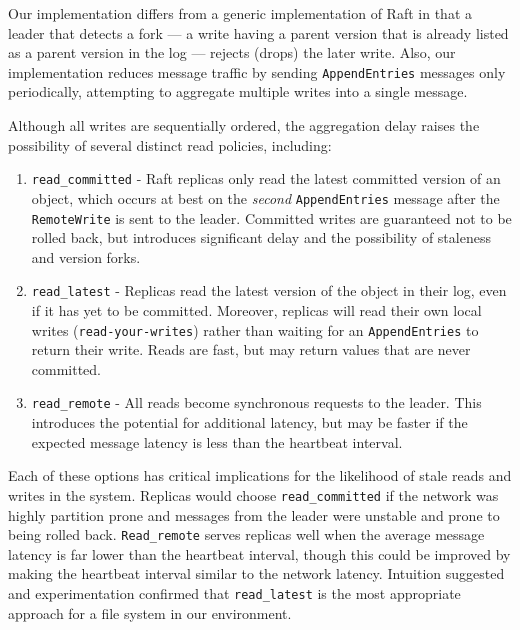 \documentclass[10pt,conference,letterpaper]{IEEEtran}
\newcommand{\todo}[1]{{\textcolor{red}{#1}}}
\newcommand{\pjk}[1]{[\todo{PJK: #1}]}
\begin{document}
Our implementation differs from a generic implementation of Raft in that
a leader that detects a
fork --- a write having a parent version that is already listed as a parent version in the
log --- rejects (drops) the later write.
Also, our implementation reduces message traffic by sending \texttt{AppendEntries}
messages only periodically, attempting to aggregate multiple writes into a single
message.



Although all writes are sequentially ordered, the aggregation delay raises the possibility
of several distinct read policies, including:
\begin{enumerate}
    \item \texttt{read\_committed} - Raft replicas only read the latest committed version
of an object, which occurs at best on the \emph{second} \texttt{AppendEntries} message
after the \texttt{RemoteWrite} is sent to the leader. Committed writes are guaranteed not
to be rolled back, but introduces significant delay and the possibility of staleness and
version forks.
    \item \texttt{read\_latest} - Replicas read the latest version of the object
in their log, even if it has yet to be committed.
Moreover, replicas will read their own local writes (\texttt{read-your-writes}) rather than waiting for an
\texttt{AppendEntries} to return their write. Reads are fast, but may return values that
are never committed.
    \item \texttt{read\_remote} - All reads become synchronous requests to the leader.
This introduces the potential for additional latency, but may be faster if the expected
message latency is less than the heartbeat interval.
\end{enumerate}

Each of these options has critical implications for the likelihood of stale reads and
writes in the system.
Replicas would choose \texttt{read\_committed} if the network was highly partition prone and
messages from the leader were unstable and prone to being rolled back.
\texttt{Read\_remote} serves replicas well when the average message latency is far lower than the
heartbeat interval, though this could be improved by making the heartbeat interval similar
to the network latency.
Intuition suggested and experimentation confirmed that \texttt{read\_latest}
is the most appropriate approach for a file
system in our environment.
\end{document}
